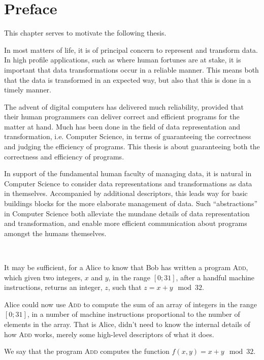 \chapter{Preface}

This chapter serves to motivate the following thesis.

In most matters of life, it is of principal concern to represent and transform
data. In high profile applications, such as where human fortunes are at stake,
it is important that data transformations occur in a reliable manner.  This
means both that the data is transformed in an expected way, but also that this
is done in a timely manner.

The advent of digital computers has delivered much reliability, provided that
their human programmers can deliver correct and efficient programs for the
matter at hand. Much has been done in the field of data representation and
transformation, i.e. Computer Science, in terms of guaranteeing the correctness
and judging the efficiency of programs. This thesis is about guaranteeing
both the correctness and efficiency of programs.

In support of the fundamental human faculty of managing data, it is natural in
Computer Science to consider data representations and transformations as data
in themselves. Accompanied by additional descriptors, this leads way for basic
buildings blocks for the more elaborate management of data. Such
``abstractions'' in Computer Science both alleviate the mundane details of data
representation and transformation, and enable more efficient communication
about programs amongst the humans themselves.

\begin{example} \ 

It may be sufficient, for a Alice to know that Bob has written a program
\textsc{Add}, which given two integers, $x$ and $y$, in the range $[0;31]$,
after a handful machine instructions, returns an integer, $z$, such that $z=x+y
\mod 32$.

Alice could now use \textsc{Add} to compute the sum of an array of integers in
the range $[0;31]$, in a number of machine instructions proportional to the
number of elements in the array. That is Alice, didn't need to know the
internal details of how \textsc{Add} works, merely some high-level descriptors
of what it does.

\end{example}

We say that the program \textsc{Add} computes the function $f(x,y)=x+y \mod
32$.

